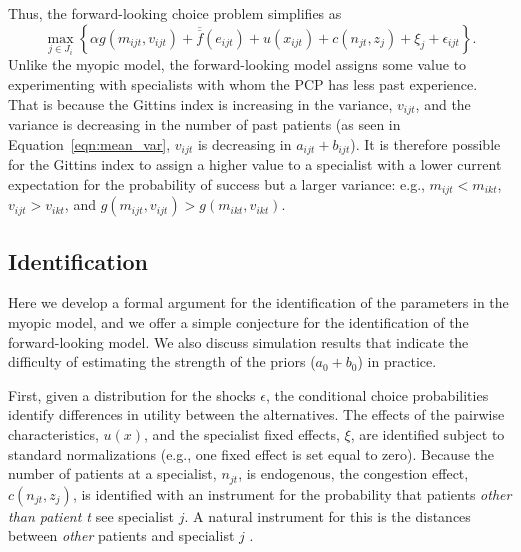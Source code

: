 \documentclass[12pt]{article}
\begin{document}
Thus, the forward-looking choice problem simplifies as
\begin{equation} 
\max_{j \in J_i} \left\{ \alpha g(m_{ijt}, v_{ijt}) + \overline{\overline{f}}(e_{ijt}) + u(x_{ijt}) + c(n_{jt}, z_j) + \xi_j + \epsilon_{ijt} \right\}.
\label{eqn:dynamic}
\end{equation}
Unlike the myopic model, the forward-looking model assigns some value to experimenting with specialists with whom the PCP has less past experience.
That is because the Gittins index is increasing in the variance, $v_{ijt}$, and the variance is decreasing in the number of past patients (as seen in Equation~\eqref{eqn:mean_var}, $v_{ijt}$ is decreasing in $a_{ijt} + b_{ijt}$). 
It is therefore possible for the Gittins index to assign a higher value to a specialist with a lower current expectation for the probability of success but a larger variance: e.g., $m_{ijt} < m_{ikt}$, $v_{ijt} > v_{ikt}$, and $g(m_{ijt}, v_{ijt}) > g(m_{ikt}, v_{ikt})$.

\subsection{Identification} 
\label{sec:identification}

Here we develop a formal argument for the identification of the parameters in the myopic model, and we offer a simple conjecture for the identification of the forward-looking model. We also discuss simulation results that indicate the difficulty of estimating the strength of the priors ($a_0 + b_0$) in practice.

First, given a distribution for the shocks $\epsilon$, the conditional choice probabilities identify differences in utility between the alternatives. The effects of the pairwise characteristics, $u(x)$, and the specialist fixed effects, $\xi$, are identified subject to standard normalizations (e.g., one fixed effect is set equal to zero). Because the number of patients at a specialist, $n_{jt}$, is endogenous, the congestion effect, $c(n_{jt}, z_j)$, is identified with an instrument for the probability that patients \emph{other than patient t} see specialist $j$. A natural instrument for this is the distances between \emph{other} patients and specialist $j$ \citep[see the description of the estimation procedure in Section \ref{sec:estimation}, and][for further details]{richards-shubik2021}.
\end{document}
